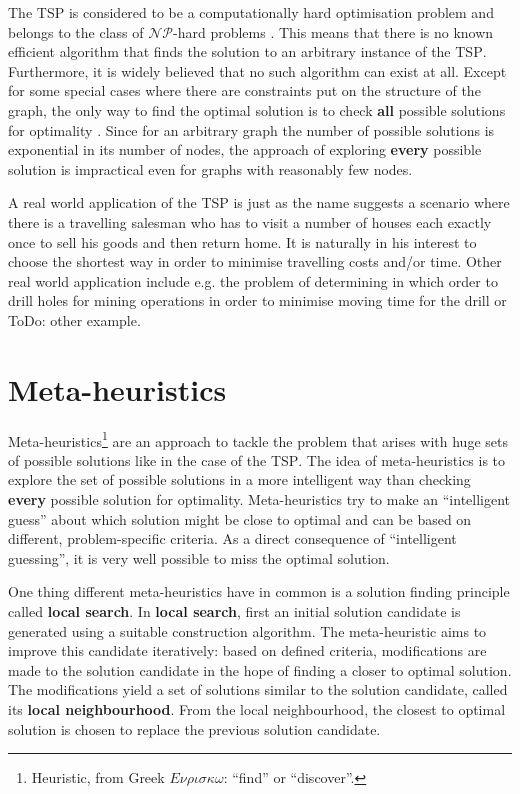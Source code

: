 The \textsc{TSP} is considered to be a computationally hard optimisation problem and belongs to the class of $\mathcal{NP}$-hard problems \cite{Garey:1979:CIG:578533}. This means that there is no known efficient algorithm that finds the solution to an arbitrary instance of the \textsc{TSP}. Furthermore, it is widely believed that no such algorithm can exist at all. Except for some special cases where there are constraints put on the structure of the graph, the only way to find the optimal solution is to check \textbf{all} possible solutions for optimality \cite{}. Since for an arbitrary graph the number of possible solutions is exponential in its number of nodes, the approach of exploring \textbf{every} possible solution is impractical even for graphs with reasonably few nodes.

A real world application of the \textsc{TSP} is just as the name suggests a scenario where there is a travelling salesman who has to visit a number of houses each exactly once to sell his goods and then return home. It is naturally in his interest to choose the shortest way in order to minimise travelling costs and/or time. Other real world application include e.g. the problem of determining in which order to drill holes for mining operations in order to minimise moving time for the drill or ToDo: other example.

\section{Meta-heuristics}
\label{chp:meta_heuristics}
Meta-heuristics\footnote{Heuristic, from Greek $E\nu\rho\iota\sigma\kappa\omega$: \enquote{find} or \enquote{discover}.} are an approach to tackle the problem that arises with huge sets of possible solutions like in the case of the \textsc{TSP}. The idea of meta-heuristics is to explore the set of possible solutions in a more intelligent way than checking \textbf{every} possible solution for optimality. Meta-heuristics try to make an \enquote{intelligent guess} about which solution might be close to optimal and can be based on different, problem-specific criteria. As a direct consequence of \enquote{intelligent guessing}, it is very well possible to miss the optimal solution.

One thing different meta-heuristics have in common is a solution finding principle called \textbf{local search}. In \textbf{local search}, first an initial solution candidate is generated using a suitable construction algorithm. The meta-heuristic aims to improve this candidate iteratively: based on defined criteria, modifications are made to the solution candidate in the hope of finding a closer to optimal solution. The modifications yield a set of solutions similar to the solution candidate, called its \textbf{local neighbourhood}. From the local neighbourhood, the closest to optimal solution is chosen to replace the previous solution candidate.

